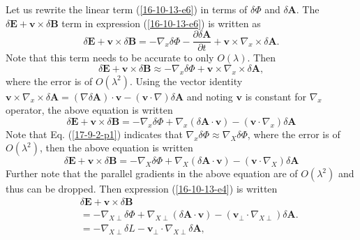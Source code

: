 \documentclass{article}
\begin{document}
Let us rewrite the linear term (\ref{16-10-13-e6}) in terms of $\delta \Phi$
and $\delta \mathbf{A}$. The $\delta \mathbf{E}+\mathbf{v} \times \delta
\mathbf{B}$ term in expression (\ref{16-10-13-e6}) is written as
\begin{equation}
  \delta \mathbf{E}+\mathbf{v} \times \delta \mathbf{B}= - \nabla_x \delta
  \Phi - \frac{\partial \delta \mathbf{A}}{\partial t} +\mathbf{v} \times
  \nabla_x \times \delta \mathbf{A}.
\end{equation}
Note that this term needs to be accurate to only $O (\lambda)$. Then
\begin{equation}
  \delta \mathbf{E}+\mathbf{v} \times \delta \mathbf{B} \approx - \nabla_x
  \delta \Phi +\mathbf{v} \times \nabla_x \times \delta \mathbf{A},
\end{equation}
where the error is of $O (\lambda^2)$. Using the vector identity $\mathbf{v}
\times \nabla_x \times \delta \mathbf{A}= (\nabla \delta \mathbf{A}) \cdot
\mathbf{v}- (\mathbf{v} \cdot \nabla) \delta \mathbf{A}$ and noting
$\mathbf{v}$ is constant for $\nabla_x$ operator, the above equation is
written
\begin{equation}
  \delta \mathbf{E}+\mathbf{v} \times \delta \mathbf{B}= - \nabla_x \delta
  \Phi + \nabla_x (\delta \mathbf{A} \cdot \mathbf{v}) - (\mathbf{v} \cdot
  \nabla_x) \delta \mathbf{A}
\end{equation}
Note that Eq. (\ref{17-9-2-p1}) indicates that $\nabla_x \delta \Phi \approx
\nabla_X \delta \Phi$, where the error is of $O (\lambda^2)$, then the above
equation is written
\begin{equation}
  \label{16-10-13-e4} \delta \mathbf{E}+\mathbf{v} \times \delta \mathbf{B}= -
  \nabla_X \delta \Phi + \nabla_X (\delta \mathbf{A} \cdot \mathbf{v}) -
  (\mathbf{v} \cdot \nabla_X) \delta \mathbf{A}
\end{equation}
Further note that the parallel gradients in the above equation are of $O
(\lambda^2)$ and thus can be dropped. Then expression (\ref{16-10-13-e4}) is
written
\begin{eqnarray}
  &  & \delta \mathbf{E}+\mathbf{v} \times \delta \mathbf{B} \nonumber\\
  &  & = - \nabla_{X \perp} \delta \Phi + \nabla_{X \perp} (\delta \mathbf{A}
  \cdot \mathbf{v}) - (\mathbf{v}_{\perp} \cdot \nabla_{X \perp}) \delta
  \mathbf{A}. \nonumber\\
  &  & = - \nabla_{X \perp} \delta L -\mathbf{v}_{\perp} \cdot \nabla_{X
  \perp} \delta \mathbf{A},  \label{18-9-14-e1}
\end{eqnarray}
\end{document}
